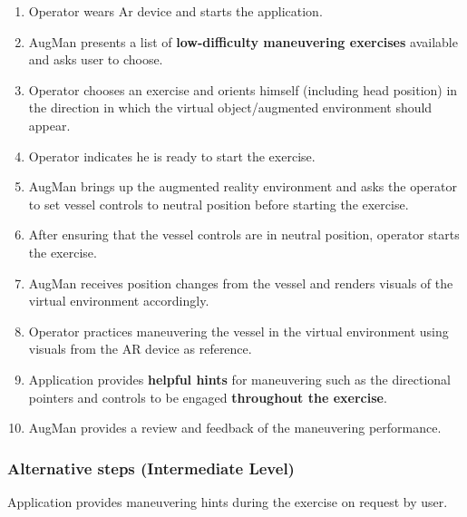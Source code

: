 \begin{enumerate}[noitemsep]
	\item Operator wears Ar device and starts the application. 
	\item AugMan presents a list of \textbf{low-difficulty maneuvering exercises} available and asks user to choose.
	\item Operator chooses an exercise and orients himself (including head position) in the direction in which the virtual object/augmented environment should appear.
	\item Operator indicates he is ready to start the exercise.
	\item AugMan brings up the augmented reality environment and asks the operator to set vessel controls to neutral position before starting the exercise.
	\item After ensuring that the vessel controls are in neutral position, operator starts the exercise. 
	\item AugMan receives position changes from the vessel and renders visuals of the virtual environment accordingly.
	\item Operator practices maneuvering the vessel in the virtual environment using visuals from the AR device as reference.
	\item Application provides \textbf{helpful hints} for maneuvering such as the directional pointers and controls to be engaged \textbf{throughout the exercise}.
	\item AugMan provides a review and feedback of the maneuvering performance.
\end{enumerate}

\subsubsection{Alternative steps (Intermediate Level)}

Application provides maneuvering hints during the exercise on request by user.

